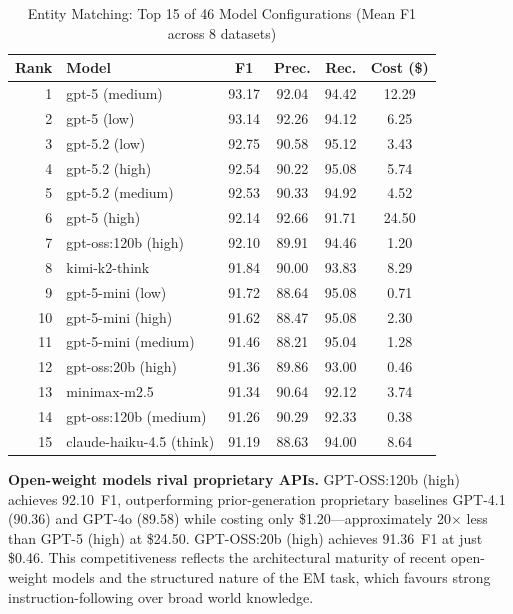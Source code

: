 \begin{table}[htbp]
\centering
\caption{Entity Matching: Top 15 of 46 Model Configurations (Mean F1 across 8 datasets)}
\label{tab:entity_matching_top}
\small
\begin{tabular}{@{}rlcccc@{}}
\toprule
\textbf{Rank} & \textbf{Model} & \textbf{F1} & \textbf{Prec.} & \textbf{Rec.} & \textbf{Cost (\$)} \\
\midrule
1  & gpt-5 (medium)        & 93.17 & 92.04 & 94.42 & 12.29 \\
2  & gpt-5 (low)           & 93.14 & 92.26 & 94.12 &  6.25 \\
3  & gpt-5.2 (low)         & 92.75 & 90.58 & 95.12 &  3.43 \\
4  & gpt-5.2 (high)        & 92.54 & 90.22 & 95.08 &  5.74 \\
5  & gpt-5.2 (medium)      & 92.53 & 90.33 & 94.92 &  4.52 \\
6  & gpt-5 (high)          & 92.14 & 92.66 & 91.71 & 24.50 \\
7  & gpt-oss:120b (high)   & 92.10 & 89.91 & 94.46 &  1.20 \\
8  & kimi-k2-think         & 91.84 & 90.00 & 93.83 &  8.29 \\
9  & gpt-5-mini (low)      & 91.72 & 88.64 & 95.08 &  0.71 \\
10 & gpt-5-mini (high)     & 91.62 & 88.47 & 95.08 &  2.30 \\
11 & gpt-5-mini (medium)   & 91.46 & 88.21 & 95.04 &  1.28 \\
12 & gpt-oss:20b (high)    & 91.36 & 89.86 & 93.00 &  0.46 \\
13 & minimax-m2.5          & 91.34 & 90.64 & 92.12 &  3.74 \\
14 & gpt-oss:120b (medium) & 91.26 & 90.29 & 92.33 &  0.38 \\
15 & claude-haiku-4.5 (think) & 91.19 & 88.63 & 94.00 & 8.64 \\
\bottomrule
\end{tabular}
\end{table}

\textbf{Open-weight models rival proprietary APIs.}  GPT-OSS:120b (high) achieves 92.10~F1, outperforming prior-generation proprietary baselines GPT-4.1 (90.36) and GPT-4o (89.58) while costing only \$1.20---approximately 20$\times$ less than GPT-5 (high) at \$24.50.  GPT-OSS:20b (high) achieves 91.36~F1 at just \$0.46.  This competitiveness reflects the architectural maturity of recent open-weight models and the structured nature of the EM task, which favours strong instruction-following over broad world knowledge.

